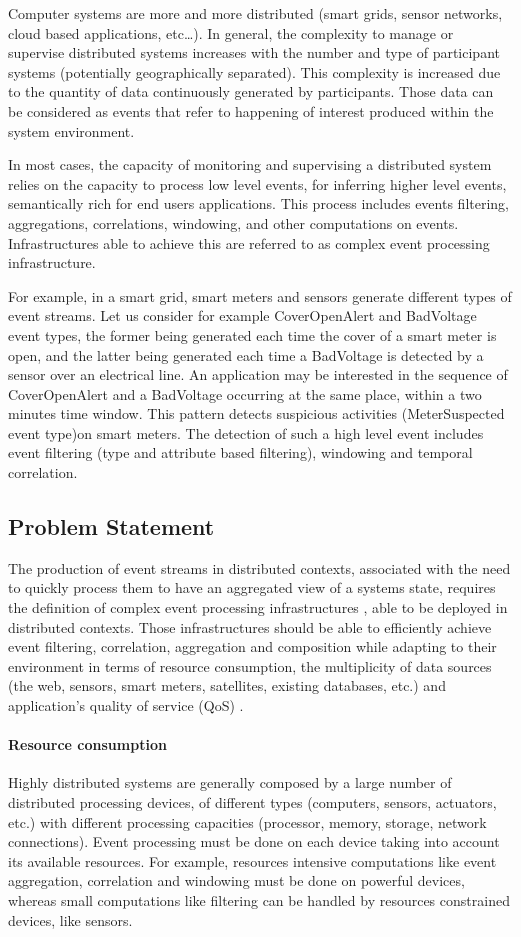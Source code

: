 \documentclass[a4paper,twoside]{article}
\begin{document}
Computer systems are more and more distributed (smart grids, sensor networks, cloud based applications, etc…). In general, the complexity to manage or supervise distributed systems increases with the number and type of participant systems (potentially geographically separated). This complexity is increased due to the quantity of data continuously generated by participants. Those data can be considered as events that refer to happening of interest produced within the system environment. 

In most cases, the capacity of monitoring and supervising a distributed system relies on the capacity to process low level events, for inferring higher level events, semantically rich for end users applications. This process includes events filtering, aggregations, correlations, windowing, and other computations on events. Infrastructures able to achieve this are referred to as complex event processing infrastructure. 

For example, in a smart grid, smart meters and sensors generate different types of event streams. Let us consider for example CoverOpenAlert and BadVoltage event types, the former being generated each time the cover of a smart meter is open, and the latter being generated each time a BadVoltage is detected by a sensor over an electrical line. An application may be interested in the sequence of CoverOpenAlert and a BadVoltage occurring at the same place, within a two minutes time window. This pattern detects suspicious activities (MeterSuspected event type)on smart meters.  The detection of such a high level event includes event filtering (type and attribute based filtering), windowing and temporal correlation.
\subsection{Problem Statement}
The production of event streams in distributed contexts, associated with the need to quickly process them to have an aggregated view of a systems state, requires the definition of complex event processing infrastructures \cite{Esper,Streambase,Cugola2009,Gyllstrom2006,Oracle}, able to be deployed in distributed contexts. Those infrastructures should be able to efficiently achieve event filtering, correlation, aggregation and composition while adapting to their environment in terms of resource consumption, the multiplicity of data sources (the web, sensors, smart meters, satellites, existing databases, etc.) and application’s quality of service (QoS) \cite{Appel2010}.
\paragraph{Resource consumption}
Highly distributed systems are generally composed by a large number of distributed processing devices, of different types (computers, sensors, actuators, etc.) with different processing capacities (processor, memory, storage, network connections). Event processing must be done on each device taking into account its available resources. For example, resources intensive computations like event aggregation, correlation and windowing must be done on powerful devices, whereas small computations like filtering can be handled by resources constrained devices, like sensors.
\end{document}
